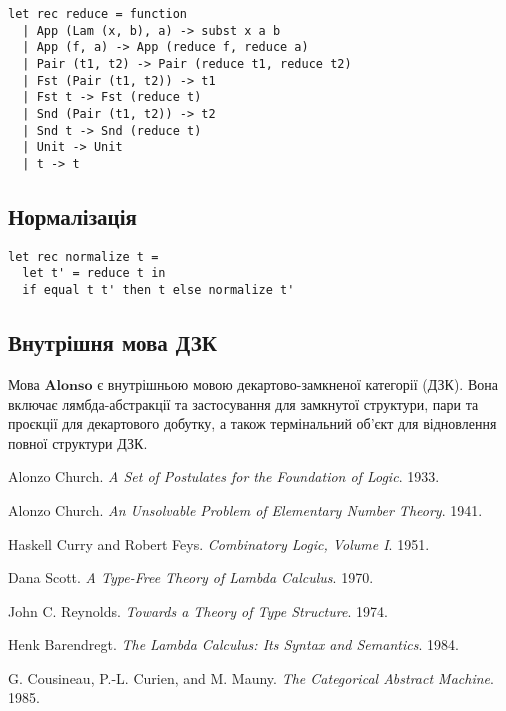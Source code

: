 \documentclass{article}
\begin{document}
\begin{lstlisting}[mathescape=true]
let rec reduce = function
  | App (Lam (x, b), a) -> subst x a b
  | App (f, a) -> App (reduce f, reduce a)
  | Pair (t1, t2) -> Pair (reduce t1, reduce t2)
  | Fst (Pair (t1, t2)) -> t1
  | Fst t -> Fst (reduce t)
  | Snd (Pair (t1, t2)) -> t2
  | Snd t -> Snd (reduce t)
  | Unit -> Unit
  | t -> t
\end{lstlisting}

\subsection{Нормалізація}

\begin{lstlisting}[mathescape=true]
let rec normalize t =
  let t' = reduce t in
  if equal t t' then t else normalize t'
\end{lstlisting}

\subsection{Внутрішня мова ДЗК}

Мова $\mathbf{Alonso}$ є внутрішньою мовою декартово-замкненої категорії (ДЗК).
Вона включає лямбда-абстракції та застосування для замкнутої структури,
пари та проєкції для декартового добутку, а також термінальний об’єкт для
відновлення повної структури ДЗК.


\begin{thebibliography}{9}

Alonzo Church.
\textit{A Set of Postulates for the Foundation of Logic}.
1933.

Alonzo Church.
\textit{An Unsolvable Problem of Elementary Number Theory}.
1941.

Haskell Curry and Robert Feys.
\textit{Combinatory Logic, Volume I}.
1951.

Dana Scott.
\textit{A Type-Free Theory of Lambda Calculus}.
1970.

John C. Reynolds.
\textit{Towards a Theory of Type Structure}.
1974.

Henk Barendregt.
\textit{The Lambda Calculus: Its Syntax and Semantics}.
1984.

G. Cousineau, P.-L. Curien, and M. Mauny.
\textit{The Categorical Abstract Machine}.
1985.

\end{thebibliography}
\end{document}

